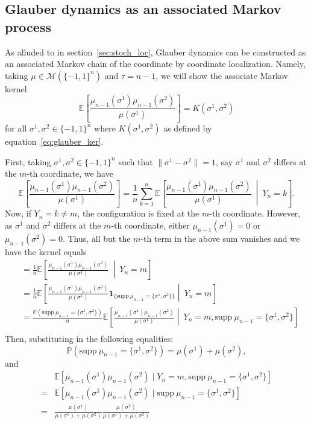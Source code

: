 \subsection{Glauber dynamics as an associated Markov process}\label{sec:Glauber_loc}

As alluded to in section~\ref{sec:stoch_loc}, Glauber dynamics can be constructed as an associated Markov 
chain of the coordinate by coordinate localization. Namely, taking \(\mu \in \mathcal{M}(\{-1, 1\}^n)\)
and \(\tau = n - 1\), we will show the associate Markov kernel 
\[\mathbb{E}\left[\frac{\mu_{n - 1}(\sigma^1)\mu_{n - 1}(\sigma^2)}{\mu(\sigma^1)}\right] = K(\sigma^1, \sigma^2)\]
for all \(\sigma^1, \sigma^2 \in \{-1, 1\}^n\) where \(K(\sigma^1, \sigma^2)\) as defined by equation~\eqref{eq:glauber_ker}.

First, taking \(\sigma^1, \sigma^2 \in \{-1, 1\}^n\) such that \(\|\sigma^1 - \sigma^2\| = 1\), say \(\sigma^1\) 
and \(\sigma^2\) differs at the \(m\)-th coordinate, we have 
\[\mathbb{E}\left[\frac{\mu_{n - 1}(\sigma^1)\mu_{n - 1}(\sigma^2)}{\mu(\sigma^1)}\right] = \frac{1}{n}\sum_{k = 1}^n \mathbb{E}
    \left[\frac{\mu_{n - 1}(\sigma^1)\mu_{n - 1}(\sigma^2)}{\mu(\sigma^1)}\ \middle\vert\ Y_n = k\right].\]
Now, if \(Y_n = k \neq m\), the configuration is fixed at the \(m\)-th coordinate. However, as \(\sigma^1\) and 
\(\sigma^2\) differs at the \(m\)-th coordinate, either \(\mu_{n - 1}(\sigma^1) = 0\) or \(\mu_{n - 1}(\sigma^2) = 0\).
Thus, all but the \(m\)-th term in the above sum vanishes and we have the kernel equals
\begin{align*}
  & = \frac{1}{n} \mathbb{E}\left[\frac{\mu_{n - 1}(\sigma^1)\mu_{n - 1}(\sigma^2)}{\mu(\sigma^1)}\ \middle\vert\ Y_n = m\right]\\
  & = \frac{1}{n} \mathbb{E}\left[\frac{\mu_{n - 1}(\sigma^1)\mu_{n - 1}(\sigma^2)}{\mu(\sigma^1)}
    \mathbf{1}_{\{\text{supp}\ \mu_{n - 1} = \{\sigma^1, \sigma^2\}\}} \middle\vert\ Y_n = m\right]\\
  & = \frac{\mathbb{P}(\text{supp}\ \mu_{n - 1} = \{\sigma^1, \sigma^2\})}{n} 
    \mathbb{E}\left[\frac{\mu_{n - 1}(\sigma^1)\mu_{n - 1}(\sigma^2)}{\mu(\sigma^1)}
    \middle\vert\ Y_n = m, \text{supp}\ \mu_{n - 1} = \{\sigma^1, \sigma^2\}\right]\\
\end{align*}
Then, substituting in the following equalities:
\[\mathbb{P}(\text{supp}\ \mu_{n - 1} = \{\sigma^1, \sigma^2\}) = \mu(\sigma^1) + \mu(\sigma^2),\]
and
\begin{align*}
  & \mathbb{E}[\mu_{n - 1}(\sigma^1)\mu_{n - 1}(\sigma^2) \mid Y_n = m, \text{supp}\ \mu_{n - 1} = \{\sigma^1, \sigma^2\}]\\
  = & \mathbb{E}[\mu_{n - 1}(\sigma^1)\mu_{n - 1}(\sigma^2) \mid \text{supp}\ \mu_{n - 1} = \{\sigma^1, \sigma^2\}]\\
  = & \frac{\mu(\sigma^1)}{\mu(\sigma^1) + \mu(\sigma^2)} \frac{\mu(\sigma^2)}{\mu(\sigma^1) + \mu(\sigma^2)}
\end{align*}
